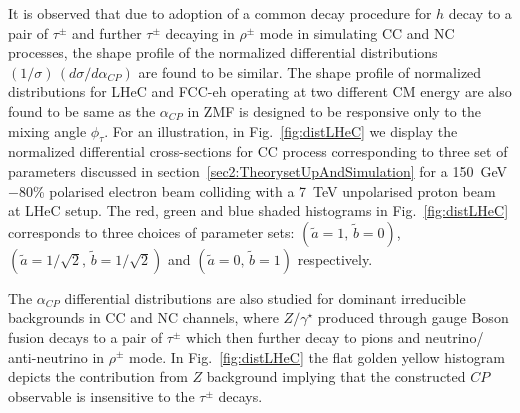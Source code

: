 \documentclass[pdftex,twocolumn,epjc3]{svjour3}          %
\begin{document}
It is  observed that  due to adoption of a common decay procedure for $h$ decay to a pair of $\tau^\pm$ and further $\tau^\pm$ decaying in $\rho^\pm$ mode in simulating CC and NC processes, the   shape profile of the normalized differential distributions $({1}/{\sigma})\,({d\sigma}/{d\alpha_{CP}})$ %
are found to be similar. The shape profile of normalized distributions for LHeC and FCC-eh operating at two different CM energy are also found to be same as the $\alpha_{CP}$ in ZMF  is designed to be responsive only to the mixing angle $\phi_\tau$. For an illustration, in Fig.~\ref{fig:distLHeC} we display the normalized differential cross-sections  for CC process corresponding to   three set of parameters discussed in section~\ref{sec2:TheorysetUpAndSimulation} for a 150~GeV  $-$80\% polarised electron beam colliding with a 7~TeV unpolarised proton beam at LHeC setup.  The red, green and blue shaded histograms in Fig.~\ref{fig:distLHeC} corresponds to three choices of parameter sets: $(\tilde a =1,\, \tilde b=0)$, $(\tilde a =1/\sqrt{2},\, \tilde b=1/\sqrt{2})$   and $(\tilde a =0,\, \tilde b=1)$  respectively. 
\par The $\alpha_{CP}$  differential distributions are also studied for  dominant irreducible  backgrounds in CC and NC channels,  where $Z/\gamma^\star$ produced through gauge Boson fusion decays    to a pair of $\tau^\pm$ which then further  decay to pions and neutrino/ anti-neutrino in $\rho^\pm$ mode.   In Fig.~\ref{fig:distLHeC} the flat golden yellow histogram depicts the contribution from $Z$ background implying that the constructed $CP$ observable is insensitive to the $\tau^\pm$ decays. 
\end{document}
